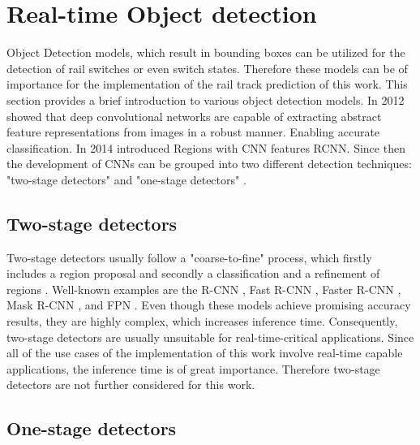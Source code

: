 \section{Real-time Object detection}
\label{sec:ObjectDetection}

Object Detection models, which result in bounding boxes can be utilized for the detection of rail switches or even switch states.
Therefore these models can be of importance for the implementation of the rail track prediction of this work.
This section provides a brief introduction to various object detection models.
In 2012 \cite{AlexNet2012} showed that deep convolutional networks are capable of extracting abstract feature representations from images in a robust manner.
Enabling accurate classification.
In 2014 \cite{RCNN2014} introduced Regions with CNN features \ac{RCNN}.
Since then the development of CNNs can be grouped into two different detection techniques: "two-stage detectors" and "one-stage detectors" \cite{20yearsSurvey} \cite{surveyObjectDetection} \cite{surveyObjectDetection2019}.

\subsection{Two-stage detectors}

Two-stage detectors usually follow a "coarse-to-fine" process, which firstly includes a region proposal and secondly a classification and a refinement of regions \cite{20yearsSurvey} \cite{surveyObjectDetection} \cite{surveyObjectDetection2019} \cite{twostageObjectDetection}.
Well-known examples are the R-CNN \cite{RCNN2014}, Fast R-CNN \cite{FastRCNN2015}, Faster R-CNN \cite{FasterRCNN2017}, Mask R-CNN \cite{MaskRCNN2017}, and \ac{FPN} \cite{FPN2017_two_stage-detector}.
Even though these models achieve promising accuracy results, they are highly complex, which increases inference time.
Consequently, two-stage detectors are usually unsuitable for real-time-critical applications.
Since all of the use cases of the implementation of this work involve real-time capable applications, the inference time is of great importance.
Therefore two-stage detectors are not further considered for this work.

\subsection{One-stage detectors}

